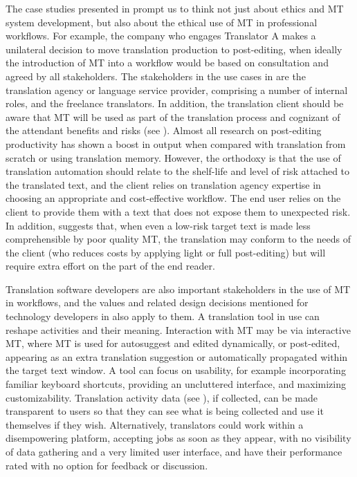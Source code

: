 \documentclass[output=paper]{langscibook}
\begin{document}
The case studies presented in  prompt us to think not just about ethics and MT system development, but also about the ethical use of MT in professional workflows. For example, the company who engages Translator A makes a unilateral decision to move translation production to post-editing, when ideally the introduction of MT into a workflow would be based on consultation and agreed by all stakeholders. The stakeholders in the use cases in  are the translation agency or language service provider, comprising a number of internal roles, and the freelance translators. In addition, the translation client should be aware that MT will be used as part of the translation process and cognizant of the attendant benefits and risks (see ). Almost all research on post-editing productivity has shown a boost in output when compared with translation from scratch or using translation memory. However, the orthodoxy is that the use of translation automation should relate to the shelf-life and level of risk attached to the translated text, and the client relies on translation agency expertise in choosing an appropriate and cost-effective workflow. The end user relies on the client to provide them with a text that does not expose them to unexpected risk. In addition, \citet{Pym2012} suggests that, when even a low-risk target text is made less comprehensible by poor quality MT, the translation may conform to the needs of the client (who reduces costs by applying light or full post-editing) but will require extra effort on the part of the end reader.

Translation software developers are also important stakeholders in the use of MT in workflows, and the values and related design decisions mentioned for technology developers in  also apply to them. A translation tool in use can reshape activities and their meaning. Interaction with MT may be via interactive MT, where MT is used for autosuggest and edited dynamically, or post-edited, appearing as an extra translation suggestion or automatically propagated within the target text window. A tool can focus on usability, for example incorporating familiar keyboard shortcuts, providing an uncluttered interface, and maximizing customizability. Translation activity data (see ), if collected, can be made transparent to users so that they can see what is being collected and use it themselves if they wish. Alternatively, translators could work within a disempowering platform, accepting jobs as soon as they appear, with no visibility of data gathering and a very limited user interface, and have their performance rated with no option for feedback or discussion.
\end{document}
